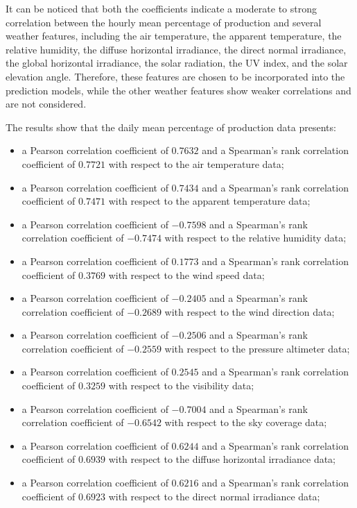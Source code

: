 It can be noticed that both the coefficients indicate a moderate to strong correlation between the hourly mean percentage of production and several weather features, including the air temperature, the apparent temperature, the relative humidity, the diffuse horizontal irradiance, the direct normal irradiance, the global horizontal irradiance, the solar radiation, the UV index, and the solar elevation angle.
Therefore, these features are chosen to be incorporated into the prediction models, while the other weather features show weaker correlations and are not considered.

The results show that the daily mean percentage of production data presents:
\begin{itemize}
  \item a Pearson correlation coefficient of $0.7632$ and a Spearman's rank correlation coefficient of $0.7721$ with respect to the air temperature data;
  \item a Pearson correlation coefficient of $0.7434$ and a Spearman's rank correlation coefficient of $0.7471$ with respect to the apparent temperature data;
  \item a Pearson correlation coefficient of $-0.7598$ and a Spearman's rank correlation coefficient of $-0.7474$ with respect to the relative humidity data;
  \item a Pearson correlation coefficient of $0.1773$ and a Spearman's rank correlation coefficient of $0.3769$ with respect to the wind speed data;
  \item a Pearson correlation coefficient of $-0.2405$ and a Spearman's rank correlation coefficient of $-0.2689$ with respect to the wind direction data;
  \item a Pearson correlation coefficient of $-0.2506$ and a Spearman's rank correlation coefficient of $-0.2559$ with respect to the pressure altimeter data;
  \item a Pearson correlation coefficient of $0.2545$ and a Spearman's rank correlation coefficient of $0.3259$ with respect to the visibility data;
  \item a Pearson correlation coefficient of $-0.7004$ and a Spearman's rank correlation coefficient of $-0.6542$ with respect to the sky coverage data;
  \item a Pearson correlation coefficient of $0.6244$ and a Spearman's rank correlation coefficient of $0.6939$ with respect to the diffuse horizontal irradiance data;
  \item a Pearson correlation coefficient of $0.6216$ and a Spearman's rank correlation coefficient of $0.6923$ with respect to the direct normal irradiance data;

\end{itemize}
